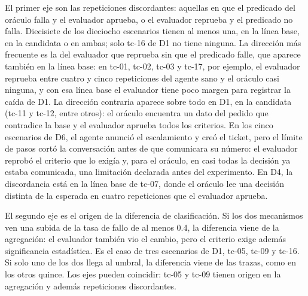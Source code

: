 \par
El primer eje son las repeticiones discordantes: aquellas en que el predicado del oráculo falla y el evaluador aprueba, o el evaluador reprueba y el predicado no falla. Diecisiete de los dieciocho escenarios tienen al menos una, en la línea base, en la candidata o en ambas; solo tc-16 de D1 no tiene ninguna. La dirección más frecuente es la del evaluador que reprueba sin que el predicado falle, que aparece también en la línea base: en tc-01, tc-02, tc-03 y tc-17, por ejemplo, el evaluador reprueba entre cuatro y cinco repeticiones del agente sano y el oráculo casi ninguna, y con esa línea base el evaluador tiene poco margen para registrar la caída de D1. La dirección contraria aparece sobre todo en D1, en la candidata (tc-11 y tc-12, entre otros): el oráculo encuentra un dato del pedido que contradice la base y el evaluador aprueba todos los criterios. En los cinco escenarios de D6, el agente anunció el escalamiento y creó el ticket, pero el límite de pasos cortó la conversación antes de que comunicara su número: el evaluador reprobó el criterio que lo exigía y, para el oráculo, en casi todas la decisión ya estaba comunicada, una limitación declarada antes del experimento. En D4, la discordancia está en la línea base de tc-07, donde el oráculo lee una decisión distinta de la esperada en cuatro repeticiones que el evaluador aprueba.
\par
El segundo eje es el origen de la diferencia de clasificación. Si los dos mecanismos ven una subida de la tasa de fallo de al menos 0.4, la diferencia viene de la agregación: el evaluador también vio el cambio, pero el criterio exige además significancia estadística. Es el caso de tres escenarios de D1, tc-05, tc-09 y tc-16. Si solo uno de los dos llega al umbral, la diferencia viene de las trazas, como en los otros quince. Los ejes pueden coincidir: tc-05 y tc-09 tienen origen en la agregación y además repeticiones discordantes.
\par

